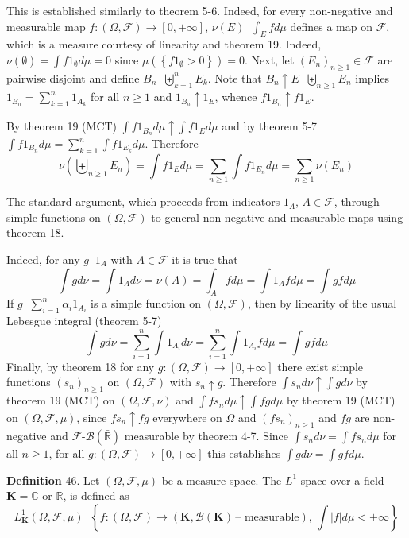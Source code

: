 \documentclass[a4paper]{article}
\newcommand{\obj}[1]{\left\{ #1 \right \}}
\newcommand{\clo}[1]{\left [ #1 \right ]}
\newcommand{\brac}[1]{\left ( #1 \right )}
\newcommand{\abs}[1]{\left | #1 \right |}
\newcommand{\Rbar}{{\bar{\mathbb{R}}}}
\newcommand{\Real}{\mathbb{R}}
\newcommand{\Zinf}{\clo{ 0, +\infty }}
\newcommand{\Cplx}{\mathbb{C}}
\newcommand{\Fcal}{\mathcal{F}}
\newcommand{\borel}[1]{\mathcal{B}\brac{#1}}
\newcommand{\defn}{\mathop{\overset{\Delta}{=}}\nolimits}
\begin{document}
This is established similarly to theorem 5-6. Indeed, for every non-negative and measurable map $f:\brac{\Omega, \Fcal}\to\Zinf$, $\nu\brac{E} \defn \int_E f d\mu$ defines a map on $\Fcal$, which is a measure courtesy of linearity and theorem 19. Indeed, $\nu\brac{\emptyset}=\int f 1_\emptyset d\mu = 0$ since $\mu\brac{\obj{f 1_\emptyset>0}}=0$. Next, let $\brac{E_n}_{n\geq1}\in\Fcal$ are pairwise disjoint and define $B_n\defn \biguplus_{k=1}^n E_k$. Note that $B_n\uparrow E\defn\biguplus_{n\geq1} E_n$ implies $1_{B_n}=\sum_{k=1}^n 1_{A_k}$ for all $n\geq1$ and $1_{B_n}\uparrow 1_E$, whence $f 1_{B_n}\uparrow f 1_E$.

By theorem 19 (MCT) $\int f 1_{B_n} d\mu\uparrow \int f 1_E d\mu$ and by theorem 5-7 $\int f 1_{B_n} d\mu = \sum_{k=1}^n \int f 1_{E_k} d\mu$. Therefore \[\nu\brac{\biguplus_{n\geq1} E_n} = \int f 1_E d\mu = \sum_{n\geq1} \int f 1_{E_n} d\mu = \sum_{n\geq1} \nu\brac{E_n}\]

The standard argument, which proceeds from indicators $1_A$, $A\in \Fcal$, through simple functions on $\brac{\Omega, \Fcal}$ to general non-negative and measurable maps using theorem 18.

Indeed, for any $g\defn 1_A$ with $A\in \Fcal$ it is true that \[\int g d\nu = \int 1_A d\nu = \nu\brac{A} = \int_A f d\mu = \int 1_A f d\mu = \int g f d\mu\] If $g\defn \sum_{i=1}^n \alpha_i 1_{A_i}$ is a simple function on $\brac{\Omega,\Fcal}$, then by linearity of the usual Lebesgue integral (theorem 5-7) \[\int g d\nu = \sum_{i=1}^n \int 1_{A_i} d\nu = \sum_{i=1}^n \int 1_{A_i} f d\mu = \int g f d\mu\] Finally, by theorem 18 for any $g:\brac{\Omega,\Fcal}\to\Zinf$ there exist simple functions $\brac{s_n}_{n\geq1}$ on $\brac{\Omega, \Fcal}$ with $s_n\uparrow g$. Therefore $\int s_n d\nu \uparrow \int g d\nu$ by theorem 19 (MCT) on $\brac{\Omega,\Fcal,\nu}$ and $\int f s_n d\mu \uparrow \int f g d\mu$ by theorem 19 (MCT) on $\brac{\Omega,\Fcal,\mu}$, since $f s_n \uparrow f g$ everywhere on $\Omega$ and $\brac{f s_n}_{n\geq1}$ and $f g$ are non-negative and $\Fcal$-$\borel{\Rbar}$ measurable by theorem 4-7. Since $\int s_n d\nu = \int f s_n d\mu$ for all $n\geq1$, for all $g:\brac{\Omega, \Fcal}\to \Zinf$ this establishes $\int g d\nu = \int g f d\mu$.

\noindent \textbf{Definition} 46.
Let $\brac{\Omega, \Fcal, \mu}$ be a measure space. The $L^1$-space over a field $\mathbf{K} = \Cplx$ or $\Real$, is defined as \[ L^1_\mathbf{K}\brac{\Omega, \Fcal, \mu} \defn \obj{ f:\brac{ \Omega, \Fcal }\to \brac{\mathbf{K}, \borel{\mathbf{K}}\,\text{-- measurable} },\,\int \abs{f} d\mu < +\infty } \]
\end{document}
